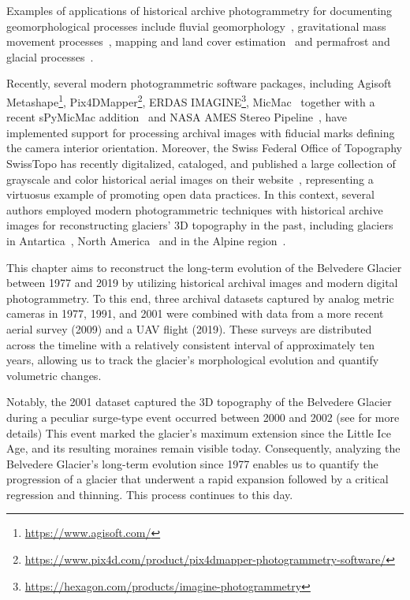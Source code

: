 Examples of applications of historical archive photogrammetry for documenting geomorphological processes include fluvial geomorphology~\citep{Bakker2017, lane2010quantification}, gravitational mass movement processes~\citep{chandler1995steady, walstra2007historical, schwab2008landsliding}, mapping and land cover estimation~\citep{Giordano2018} and permafrost and glacial processes~\citep{kaab2002monitoring, Kaufmann2003, keutterling2006monitoring, mondino2008multi, Fischer2011}.

Recently, several modern photogrammetric software packages, including Agisoft Metashape\footnote{\url{https://www.agisoft.com/}}, Pix4DMapper\footnote{\url{https://www.pix4d.com/product/pix4dmapper-photogrammetry-software/}}, ERDAS IMAGINE\footnote{\url{https://hexagon.com/products/imagine-photogrammetry}}, MicMac~\citep{rupnik2017micmac, Zhang2021} together with a recent sPyMicMac addition~\citep{McNabb2020} and NASA AMES Stereo Pipeline~\citep{Beyer2018}, have implemented support for processing archival images with fiducial marks defining the camera interior orientation. 
Moreover, the Swiss Federal Office of Topography SwissTopo has recently digitalized, cataloged, and published a large collection of grayscale and color historical aerial images on their website~\citep{Heisig2021}, representing a virtuosus example of promoting open data practices.
In this context, several authors employed modern photogrammetric techniques with historical archive images for reconstructing glaciers' 3D topography in the past, including glaciers in Antartica~\citep{Child2021, Dahle2024}, North America~\citep{Knuth2023} and in the Alpine region~\citep{Molg2017, poli2020use}.

This chapter aims to reconstruct the long-term evolution of the Belvedere Glacier between 1977 and 2019 by utilizing historical archival images and modern digital photogrammetry.
To this end, three archival datasets captured by analog metric cameras in 1977, 1991, and 2001 were combined with data from a more recent aerial survey (2009) and a UAV flight (2019).
These surveys are distributed across the timeline with a relatively consistent interval of approximately ten years, allowing us to track the glacier's morphological evolution and quantify volumetric changes. 

Notably, the 2001 dataset captured the 3D topography of the Belvedere Glacier during a peculiar surge-type event \citep{Haeberli2002} occurred between 2000 and 2002 (see  for more  details)
This event marked the glacier's maximum extension since the Little Ice Age, and its resulting moraines remain visible today.
Consequently, analyzing the Belvedere Glacier's long-term evolution since 1977 enables us to quantify the progression of a glacier that underwent a rapid expansion followed by a critical regression and thinning. This process continues to this day.

